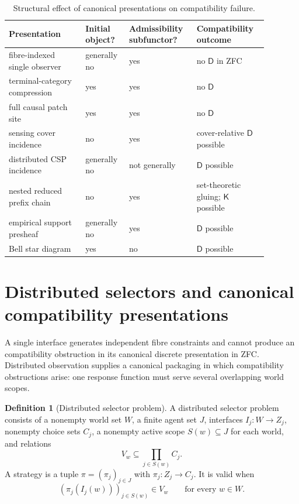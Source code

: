 \documentclass[11pt]{article}
\theoremstyle{plain}
\theoremstyle{definition}
\newtheorem{definition}[theorem]{Definition}
\theoremstyle{remark}
\begin{document}
\begin{table}[htbp]
\centering
\caption{Structural effect of canonical presentations on compatibility failure.}
\label{tab:presentations}
\begin{tabular}{@{}p{0.27\linewidth}p{0.14\linewidth}p{0.22\linewidth}p{0.25\linewidth}@{}}
\toprule
Presentation & Initial object? & Admissibility subfunctor? & Compatibility outcome\\
\midrule
fibre-indexed single observer & generally no & yes & no $\mathsf D$ in ZFC\\
terminal-category compression & yes & yes & no $\mathsf D$\\
full causal patch site & yes & yes & no $\mathsf D$\\
sensing cover incidence & no & yes & cover-relative $\mathsf D$ possible\\
distributed CSP incidence & generally no & not generally & $\mathsf D$ possible\\
nested reduced prefix chain & no & yes & set-theoretic gluing; $\mathsf K$ possible\\
empirical support presheaf & generally no & yes & $\mathsf D$ possible\\
Bell star diagram & yes & no & $\mathsf D$ possible\\
\bottomrule
\end{tabular}
\end{table}


\section{Distributed selectors and canonical compatibility presentations}\label{sec:distributed}

A single interface generates independent fibre constraints and cannot produce an
compatibility obstruction in its canonical discrete presentation in ZFC. Distributed observation supplies
a canonical packaging in which compatibility obstructions arise: one response
function must serve several overlapping
world scopes.

\begin{definition}[Distributed selector problem]\label{def:distributed}
A distributed selector problem consists of a nonempty world set $W$, a finite
agent set $J$, interfaces $I_j:W\to Z_j$, nonempty choice sets $C_j$, a nonempty
active scope $S(w)\subseteq J$ for each world, and relations
\[
V_w\subseteq\prod_{j\in S(w)}C_j.
\]
A strategy is a tuple $\pi=(\pi_j)_{j\in J}$ with
$\pi_j:Z_j\to C_j$. It is valid when
\[
(\pi_j(I_j(w)))_{j\in S(w)}\in V_w
\qquad\text{for every }w\in W.
\]
\end{definition}
\end{document}
